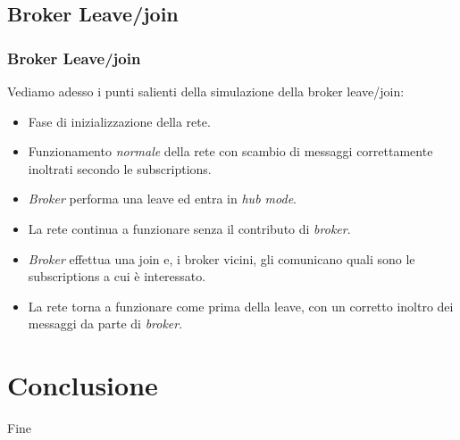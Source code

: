 \documentclass{beamer}
\begin{document}
\begin{frame}

	

\end{frame}

\subsection{Broker Leave/join}

\begin{frame}
	\frametitle{Broker Leave/join}
	
	Vediamo adesso i punti salienti della simulazione della broker leave/join:
	\begin{itemize}
		\item Fase di inizializzazione della rete.
		\item Funzionamento \emph{normale} della rete con scambio di messaggi correttamente inoltrati secondo le subscriptions.
		\item \emph{Broker} performa una leave ed entra in \emph{hub mode}.
		\item La rete continua a funzionare senza il contributo di \emph{broker}.
		\item \emph{Broker} effettua una join e, i broker vicini, gli comunicano quali sono le subscriptions a cui è interessato.
		\item La rete torna a funzionare come prima della leave, con un corretto inoltro dei messaggi da parte di \emph{broker}.
	\end{itemize}
\end{frame}

\begin{frame}
	
	
	
\end{frame}

\section{Conclusione}
\begin{frame}
	\Huge{\centerline{Fine}}
\end{frame}

\end{document}
